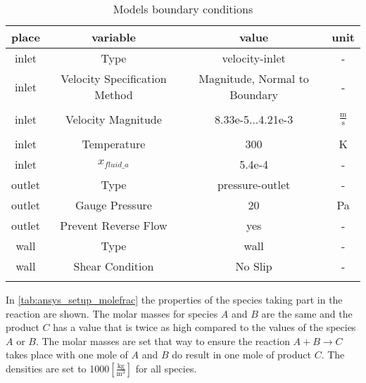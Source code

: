 \documentclass[../thesis.tex]{subfiles}
\begin{document}
\begin{table} [htb]
	\centering
	\caption{Models boundary conditions}
	\begin{tabular}{ cccc }
		\hline
		place & variable & value & unit \\
		\hline
		inlet & Type & velocity-inlet & - \\
		inlet & Velocity Specification Method & Magnitude, Normal to Boundary & - \\
		\\[-1em]
		inlet & Velocity Magnitude & 8.33e-5...4.21e-3 & $\frac{\text{m}}{\text{s}}$ \\
		\\[-1em]
		inlet & Temperature & 300 & K \\
		inlet & $x_{fluid\_a}$ & 5.4e-4 & - \\
		outlet & Type & pressure-outlet & - \\
		outlet & Gauge Pressure & 20 & Pa \\
		outlet & Prevent Reverse Flow & yes & - \\
		wall & Type & wall & - \\
		wall & Shear Condition & No Slip & - \\
		\hline
		\label{tab:ansys_setup_boundary}
	\end{tabular}
\end{table}
In \autoref{tab:ansys_setup_molefrac} the properties of the species taking part in the reaction are shown. The molar masses for species $A$ and $B$ are the same and the product $C$ has a value that is twice as high compared to the values of the species $A$ or $B$. The molar masses are set that way to ensure the reaction $A+B \rightarrow C$ takes place with one mole of $A$ and $B$ do result in one mole of product $C$. The densities are set to 1000$ \left[\frac{\mathrm{kg}}{\mathrm{m}^3}\right] $ for all species.
\end{document}
